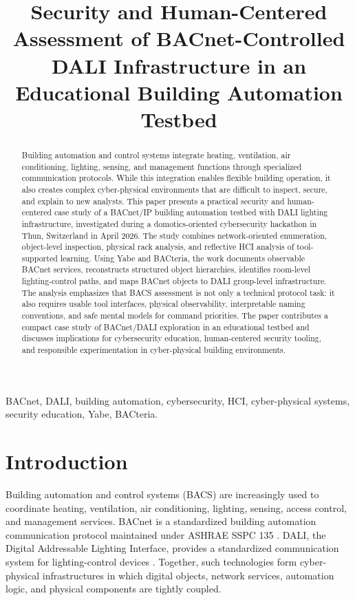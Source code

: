 \documentclass[10pt,conference]{IEEEtran}
\title{Security and Human-Centered Assessment of BACnet-Controlled DALI Infrastructure in an Educational Building Automation Testbed}
\author{
\IEEEauthorblockN{Ariton Verush}
\IEEEauthorblockA{
MSc in Computer Science\\
University of Bern\\
Bern, Switzerland\\
Email: ariton.verush@students.unibe.ch}
}
\begin{document}
\maketitle

\begin{abstract}
Building automation and control systems integrate heating, ventilation, air conditioning, lighting, sensing, and management functions through specialized communication protocols. While this integration enables flexible building operation, it also creates complex cyber-physical environments that are difficult to inspect, secure, and explain to new analysts. This paper presents a practical security and human-centered case study of a BACnet/IP building automation testbed with DALI lighting infrastructure, investigated during a domotics-oriented cybersecurity hackathon in Thun, Switzerland in April 2026. The study combines network-oriented enumeration, object-level inspection, physical rack analysis, and reflective HCI analysis of tool-supported learning. Using Yabe and BACteria, the work documents observable BACnet services, reconstructs structured object hierarchies, identifies room-level lighting-control paths, and maps BACnet objects to DALI group-level infrastructure. The analysis emphasizes that BACS assessment is not only a technical protocol task: it also requires usable tool interfaces, physical observability, interpretable naming conventions, and safe mental models for command priorities. The paper contributes a compact case study of BACnet/DALI exploration in an educational testbed and discusses implications for cybersecurity education, human-centered security tooling, and responsible experimentation in cyber-physical building environments.
\end{abstract}

\begin{IEEEkeywords}
BACnet, DALI, building automation, cybersecurity, HCI, cyber-physical systems, security education, Yabe, BACteria.
\end{IEEEkeywords}

\section{Introduction}

Building automation and control systems (BACS) are increasingly used to coordinate heating, ventilation, air conditioning, lighting, sensing, access control, and management services. BACnet is a standardized building automation communication protocol maintained under ASHRAE SSPC 135 \cite{bacnet_committee,ashrae_bacnet}. DALI, the Digital Addressable Lighting Interface, provides a standardized communication system for lighting-control devices \cite{dali_alliance}. Together, such technologies form cyber-physical infrastructures in which digital objects, network services, automation logic, and physical components are tightly coupled.
\end{document}
